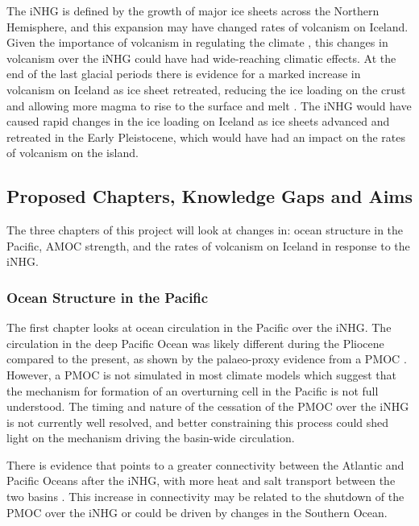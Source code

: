The iNHG is defined by the growth of major ice sheets across the Northern Hemisphere, and this expansion may have changed rates of volcanism on Iceland. Given the importance of volcanism in regulating the climate \citep{mckenzieContinentalArcVolcanism2016}, this changes in volcanism over the iNHG could have had wide-reaching climatic effects. At the end of the last glacial periods there is evidence for a marked increase in volcanism on Iceland as ice sheet retreated, reducing the ice loading on the crust and allowing more magma to rise to the surface and melt \citep{maclennanLinkVolcanismDeglaciation2002}. The iNHG would have caused rapid changes in the ice loading on Iceland as ice sheets advanced and retreated in the Early Pleistocene, which would have had an impact on the rates of volcanism on the island.

\subsection{Proposed Chapters, Knowledge Gaps and Aims}

The three chapters of this project will look at changes in: ocean structure in the Pacific, AMOC strength, and the rates of volcanism on Iceland in response to the iNHG.

\subsubsection{Ocean Structure in the Pacific}

The first chapter looks at ocean circulation in the Pacific over the iNHG. The circulation in the deep Pacific Ocean was likely different during the Pliocene compared to the present, as shown by the palaeo-proxy evidence from a PMOC \citep{burlsActivePacificMeridional2017,shanklePlioceneDecouplingEquatorial2021,fordSustainedMidPlioceneWarmth2022}. However, a PMOC is not simulated in most climate models \citep{tanModelingModernlikePCO22020a, zhangMidPlioceneAtlanticMeridional2021} which suggest that the mechanism for formation of an overturning cell in the Pacific is not full understood. The timing and nature of the cessation of the PMOC over the iNHG is not currently well resolved, and better constraining this process could shed light on the mechanism driving the basin-wide circulation.

There is evidence that points to a greater connectivity between the Atlantic and Pacific Oceans after the iNHG, with more heat and salt transport between the two basins \citep{woodardAntarcticRoleNorthern2014}. This increase in connectivity may be related to the shutdown of the PMOC over the iNHG or could be driven by changes in the Southern Ocean.

